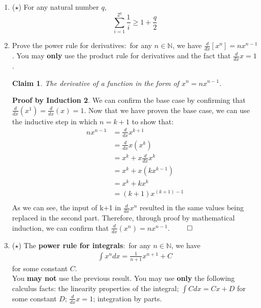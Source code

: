 \documentclass[11pt]{letter}
\newtheorem{claim}{Claim}
\theoremstyle{definition}
\newtheorem{PBI}{Proof by Induction}
\begin{document}
\begin{description}
\begin{enumerate}
\begin{PBI}
\begin{align*}
&=2^{n+1}\\
&=2(2^{n}) \\
\end{align*}
This confirms that $2^n$ accurately describes the probability of heads and tails. Through Mathemartical Induction, we must conclude that given $n$ coin tosses, there are a total of $2^n$ possibilities. $\qed$
\end{PBI}
			\item ($\star$) For any natural number $q$, $$\sum_{i=1}^{2^q}\frac{1}{i}\geq 1+\frac{q}{2}$$
			\item Prove the power rule for derivatives:~for any $n\in\mathbb{N}$, we have $\frac{d}{dx}[x^n]=nx^{n-1}$. You may {\bfseries only} use the product rule for derivatives and the fact that $\frac{d}{dx}x=1$.
\begin{claim}
	The derivative of a function in the form of $x^n=nx^{n-1}$.
\end{claim}
\begin{PBI}
We can confirm the base case by confirming that $\frac{d}{dx}(x^1)=\frac{d}{dx}(x)=1$. Now that we have proven the base case, we can use the inductive step in which $n=k+1$ to show that: \\
\begin{align*}
nx^{n-1}&=\frac{d}{dx}x^{k+1}\\
&= \frac{d}{dx}x(x^k) \\
&= x^k+x\frac{d}{dx}x^k  \tag{Applied product rule} \\
&= x^k+x(kx^{k-1}) \tag{Substituted with the inductive assumption} \\
&= x^k+kx^k \\
&= (k+1)x^{(k+1)-1} \\
\end{align*}
As we can see, the input of k+1 in $\frac{d}{dx}x^{n}$ resulted in the same values being replaced in the second part. Therefore, through proof by mathematical induction, we can confirm that $\frac{d}{dx}(x^n)=nx^{n-1}$. $\qed$
\end{PBI}
			 \item ($\star$) The {\bfseries power rule for integrals}:~for any $n\in\mathbb{N}$, we have 
				\begin{align*}
					\int x^ndx=\frac{1}{n+1}x^{n+1}+C
				\end{align*}
				for some constant $C$.\\
				You {\bfseries may not} use the previous result. You may use {\bfseries only} the following calculus facts: the linearity properties of the integral; $\int C dx=Cx+D$ for some constant $D$; $\frac{d}{dx} x=1$; integration by parts.

\end{enumerate}
\end{description}
\end{document}
